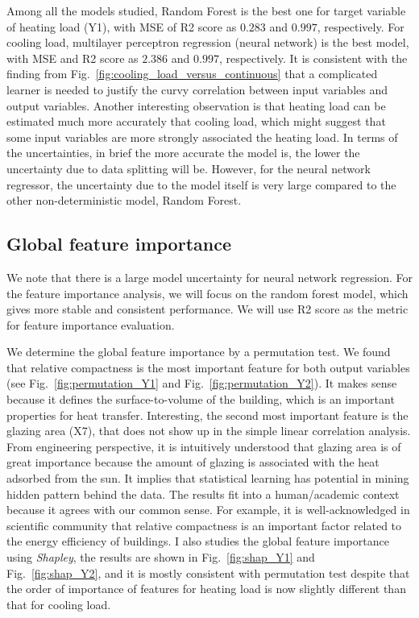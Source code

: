 \documentclass{article}
\begin{document}
Among all the models studied, Random Forest is the best one for target variable of heating load (Y1), with MSE of R2 score as $0.283$ and $0.997$, respectively. For cooling load, multilayer perceptron regression (neural network) is the  best model, with MSE and  R2 score as $2.386$ and $0.997$, respectively. It is consistent with the finding from Fig.~\ref{fig:cooling_load_versus_continuous} that a complicated learner is needed to justify the curvy correlation between input variables and output variables.
Another interesting observation is that heating load can be estimated much more accurately that cooling load, which might suggest that some input variables are more strongly associated the heating load. In terms of the uncertainties, in brief the more accurate the model is, the lower the uncertainty due to data splitting will be. However, for the neural network regressor, the uncertainty due to the model itself is very large compared to the other non-deterministic model, Random Forest. 

\subsection{Global feature importance \label{subsec:gfi}}
We note that there is a large model uncertainty for neural network regression. For the feature importance analysis, we will focus on the random forest model, which gives more stable and consistent performance. We will use R2 score as the metric for feature importance evaluation. 

We determine the global feature importance by a permutation test. We found that relative compactness is the most important feature for both output variables (see Fig.~\ref{fig:permutation_Y1} and Fig.~\ref{fig:permutation_Y2}). It makes sense because it defines the surface-to-volume of the building, which is an important properties for heat transfer. Interesting, the second most important feature is the glazing area (X7), that does not show up in the simple linear correlation analysis. From engineering perspective, it is intuitively understood that glazing area is of great importance because the amount of glazing is associated with the heat adsorbed from the sun. It implies that statistical learning has potential in mining  hidden pattern behind the data. The results fit into a human/academic context because it agrees with our common sense. For example, it is well-acknowledged in scientific community that relative compactness is an important factor related to the energy efficiency of buildings. I also studies the global feature importance using \textit{Shapley}, the results are shown in Fig.~\ref{fig:shap_Y1} and Fig.~\ref{fig:shap_Y2}, and it is mostly consistent with permutation test despite that 
the order of importance of features for heating load is now slightly different than that for cooling load.
\end{document}

